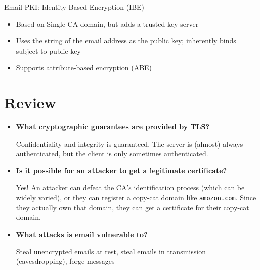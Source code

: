 \begin{exbox}{Email PKI: Identity-Based Encryption (IBE)}{}
    \begin{itemize}[noitemsep]
        \item Based on Single-CA domain, but adds a trusted key server
        \item Uses the string of the email address as the public key; inherently binds subject to public key
        \item Supports attribute-based encryption (ABE)
    \end{itemize}
\end{exbox}

\section*{Review}
\begin{itemize}[noitemsep]
    \item \textbf{What cryptographic guarantees are provided by TLS?}

    Confidentiality and integrity is guaranteed. The server is (almost) always authenticated, but the client is only sometimes authenticated.

    \item \textbf{Is it possible for an attacker to get a legitimate certificate?}

    Yes! An attacker can defeat the CA's identification process (which can be widely varied), or they can register a copy-cat domain like \texttt{amozon.com}. Since they actually own that domain, they can get a certificate for their copy-cat domain.

    \item \textbf{What attacks is email vulnerable to?}

    Steal unencrypted emails at rest, steal emails in transmission (eavesdropping), forge messages 
\end{itemize}
